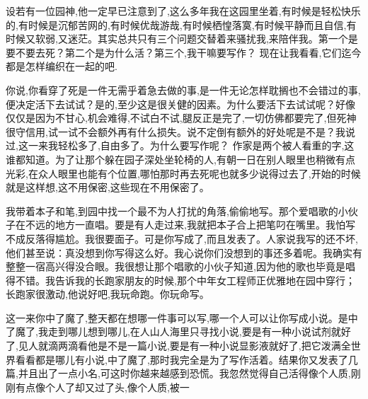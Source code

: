 \documentclass{ctexart}
\newcommand{\nm}{\normalsize}
\renewcommand{\\}{\par}
\begin{document}
\nm \fangsong \\设若有一位园神,他一定早已注意到了,这么多年我在这园里坐着,有时候是轻松快乐的,有时候是沉郁苦网的,有时候优哉游哉,有时候栖惶落寞,有时候平静而且自信,有时候又软弱,又迷茫。其实总共只有三个问题交替着来骚扰我,来陪伴我。第一个是要不要去死？第二个是为什么活？第三个,我干嘛要写作？ 现在让我看看,它们迄今都是怎样编织在一起的吧.\\你说,你看穿了死是一件无需乎着急去做的事,是一件无论怎样耽搁也不会错过的事,便决定活下去试试？是的,至少这是很关健的因素。为什么要活下去试试呢？好像仅仅是因为不甘心,机会难得,不试白不试,腿反正是完了,一切仿佛都要完了,但死神很守信用,试一试不会额外再有什么损失。说不定倒有额外的好处呢是不是？我说过,这一来我轻松多了,自由多了。为什么要写作呢？ 作家是两个被人看重的字,这谁都知道。为了让那个躲在园子深处坐轮椅的人,有朝一日在别人眼里也稍微有点光彩,在众人眼里也能有个位置,哪怕那时再去死呢也就多少说得过去了,开始的时候就是这样想,这不用保密,这些现在不用保密了。 \\我带着本子和笔,到园中找一个最不为人打扰的角落,偷偷地写。那个爱唱歌的小伙子在不远的地方一直唱。要是有人走过来,我就把本子合上把笔叼在嘴里。我怕写不成反落得尴尬。我很要面子。可是你写成了,而且发表了。人家说我写的还不坏,他们甚至说：真没想到你写得这么好。我心说你们没想到的事还多着呢。我确实有整整一宿高兴得没合眼。我很想让那个唱歌的小伙子知道,因为他的歌也毕竟是唱得不错。我告诉我的长跑家朋友的时候,那个中年女工程师正优雅地在园中穿行；长跑家很激动,他说好吧,我玩命跑。你玩命写。\\这一来你中了魔了,整天都在想哪一件事可以写,哪一个人可以让你写成小说。是中了魔了,我走到哪儿想到哪儿,在人山人海里只寻找小说,要是有一种小说试剂就好了,见人就滴两滴看他是不是一篇小说,要是有一种小说显影液就好了,把它泼满全世界看看都是哪儿有小说,中了魔了,那时我完全是为了写作活着。结果你又发表了几篇,并且出了一点小名,可这时你越来越感到恐慌。我忽然觉得自己活得像个人质,刚刚有点像个人了却又过了头,像个人质,被一
\end{document}
